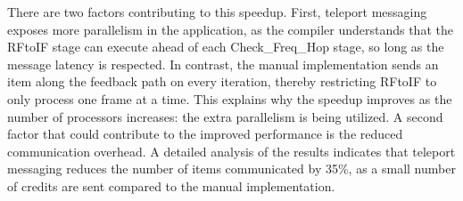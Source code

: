 There are two factors contributing to this speedup.  First, teleport
messaging exposes more parallelism in the application, as the compiler
understands that the RFtoIF stage can execute ahead of each
Check\_Freq\_Hop stage, so long as the message latency is respected.
In contrast, the manual implementation sends an item along the
feedback path on every iteration, thereby restricting RFtoIF to only
process one frame at a time.  This explains why the speedup improves
as the number of processors increases: the extra parallelism is being
utilized.  A second factor that could contribute to the improved
performance is the reduced communication overhead.  A detailed
analysis of the results indicates that teleport messaging reduces the
number of items communicated by 35\%, as a small number of credits are
sent compared to the manual implementation.
